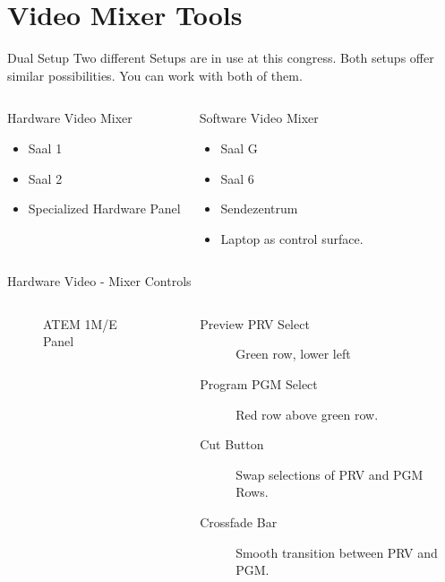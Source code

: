 \documentclass[aspectratio=169]{beamer}
\begin{document}
\section{Video Mixer Tools}

\begin{frame}{Dual Setup}
	Two different Setups are in use at this congress. 
	Both setups offer similar possibilities. 
	You can work with both of them.

	\begin{columns}[T,onlytextwidth]
		\begin{exampleblock}{Hardware Video Mixer}
			\begin{itemize}
				\item Saal 1
				\item Saal 2
				\item Specialized Hardware Panel
			\end{itemize}
		\end{exampleblock}

		\begin{exampleblock}{Software Video Mixer}
			\begin{itemize}
				\item Saal G
				\item Saal 6
				\item Sendezentrum
				\item Laptop as control surface.
			\end{itemize}
		\end{exampleblock}
	\end{columns}

\end{frame}

\begin{frame}{Hardware Video - Mixer Controls}
	\begin{columns}[T,onlytextwidth]
	\begin{figure} 
		\centering
		\def\svgwidth{0.9\textwidth}
		
		\caption{ATEM 1M/E Panel}
		\label{fig:1me1}
	\end{figure}
	\begin{description}
		\item[Preview PRV Select] Green row, lower left 
		\item[Program PGM Select] Red row above green row.
		\item[Cut Button] Swap selections of PRV and PGM Rows.
		\item[Crossfade Bar] Smooth transition between PRV and PGM.
     \end{description}
	\end{columns}
\end{frame}
\end{document}
